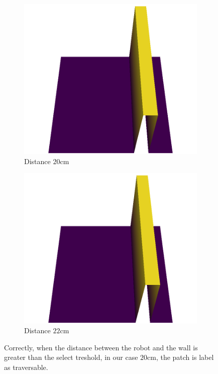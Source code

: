 \begin{figure}[H]
\begin{subfigure}[b]{0.33\textwidth}
    \end{subfigure}   \\
    \begin{subfigure}[b]{0.33\textwidth}
        \includegraphics[width=\linewidth]{../img/5/custom_patches/walls_front/2-3d.png}
        \caption{Distance $20$cm}
    \end{subfigure}   
    \begin{subfigure}[b]{0.33\textwidth}
        \includegraphics[width=\linewidth]{../img/5/custom_patches/walls_front/1-3d.png}
        \caption{Distance $22$cm}
    \end{subfigure}   
    \caption{Correctly, when the distance between the robot and the wall is greater than the select treshold, in our case $20$cm, the patch is label as traversable.}
    \label{fig: walls-traversable}
\end{figure}
